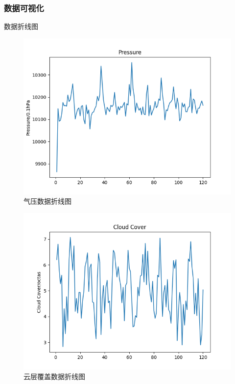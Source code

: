 \documentclass[10pt]{beamer}
\begin{document}
\begin{frame}
	\frametitle{数据可视化}
	\begin{block}{数据折线图}
		\begin{figure}[h!]
			\centering
			\includegraphics[scale=0.21]{../src/prepare_data/pp.png}
			\caption{气压数据折线图}
		\end{figure}

		\begin{figure}[h!]
			\centering
			\includegraphics[scale=0.21]{../src/prepare_data/cc.png}
			\caption{云层覆盖数据折线图}
		\end{figure}


\end{block}
\end{frame}
\end{document}

